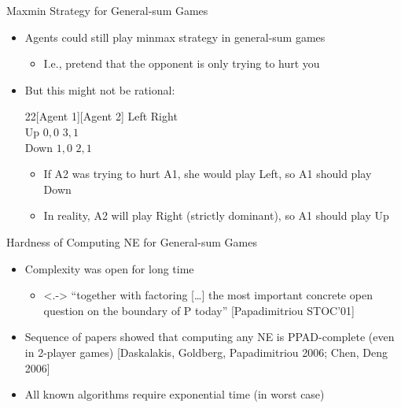 \documentclass[11pt,aspectratio=169,handout]{beamer}
\begin{document}
  \begin{frame}{Maxmin Strategy for General-sum Games}
   \begin{itemize}
    \item<1-> Agents could still play minmax strategy in general-sum games
    \begin{itemize}
     \item<2-> I.e., pretend that the opponent is only trying to hurt you
    \end{itemize}
    \item<3-> But this might not be rational:
    \begin{center}
    \hspace{-5em}
     \begin{game}{2}{2}[Agent 1][Agent 2]
         \> Left   \> Right  \\
      Up \> $0,0$ \> $3,1$ \\
      Down \> $1,0$ \> $2,1$
     \end{game}
    \end{center}
    \vspace{1 em}
    \begin{itemize}
     \item<5-> If A2 was trying to hurt A1, she would play Left, so A1 should play Down
     \item<6-> In reality, A2 will play Right (strictly dominant), so A1 should play Up
    \end{itemize}
   \end{itemize}
  \end{frame}

  \begin{frame}{Hardness of Computing NE for General-sum Games }
   \begin{itemize}[<+->]
    \item Complexity was open for long time
    \begin{itemize}
     \item<.-> “together with factoring […] the most important concrete open question on
the boundary of P today” {\scriptsize \color[rgb]{0.29, 0.59, 0.9} [Papadimitriou STOC’01]}
    \end{itemize}
    \item Sequence of papers showed that computing any NE is PPAD-complete
(even in 2-player games) {\scriptsize \color[rgb]{0.29, 0.59, 0.9} [Daskalakis, Goldberg, Papadimitriou 2006; Chen, Deng 2006]}
    \item All known algorithms require \alert{exponential time} (in worst case)
   \end{itemize}
  \end{frame}
\end{document}
